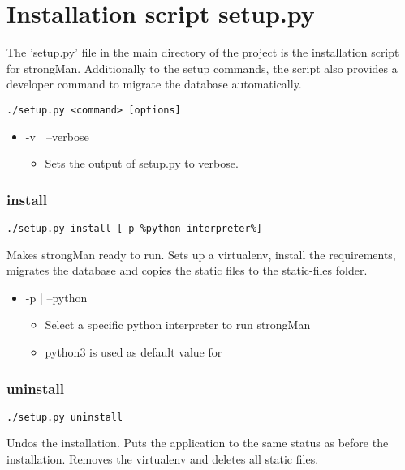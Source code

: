 \section{Installation script setup.py}
The 'setup.py' file in the main directory of the project is the installation script for strongMan. Additionally to the setup commands, the script also provides a developer command to migrate the database automatically.

\begin{lstlisting}[style=BashInputStyle]
	 ./setup.py <command> [options]
\end{lstlisting}

\begin{itemize}
	\item -v | --verbose
	\begin{itemize}
	    \item Sets the output of setup.py to verbose.
	\end{itemize}
\end{itemize}

\subsubsection{install}
\begin{lstlisting}[style=BashInputStyle]
	 ./setup.py install [-p %python-interpreter%]
\end{lstlisting}
Makes strongMan ready to run. Sets up a virtualenv, install the requirements, migrates the database and copies the static files to the static-files folder.
\begin{itemize}
	\item -p | --python %
	\begin{itemize}
	    \item Select a specific python interpreter to run strongMan
	    \item python3 is used as default value for %
	\end{itemize}
\end{itemize}

\subsubsection{uninstall}
\begin{lstlisting}[style=BashInputStyle]
	 ./setup.py uninstall
\end{lstlisting}
Undos the installation. Puts the application to the same status as before the installation. Removes the virtualenv and deletes all static files.

